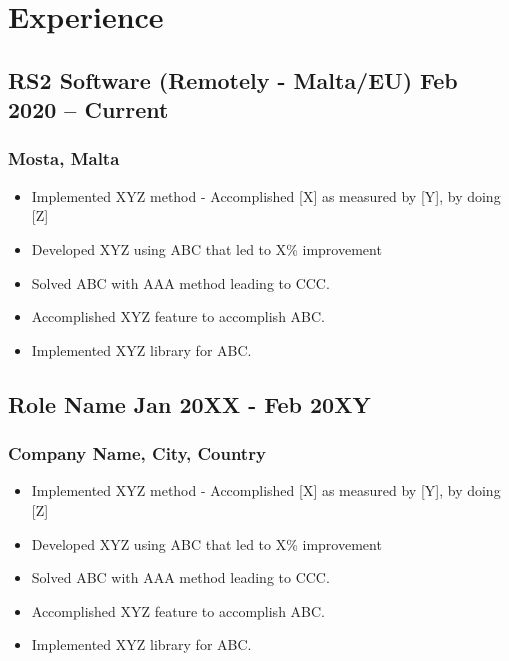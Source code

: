 \documentclass[11pt]{article}
\begin{document}
\section{Experience}
\subsection{RS2 Software (Remotely - Malta/EU) \hfill \normalfont Feb 2020 -- Current}
\subsubsection{Mosta, Malta}
\begin{itemize}
    \item[\checkmark] Implemented XYZ method - Accomplished [X] as measured by [Y], by doing [Z] 
    \item[\checkmark]  Developed XYZ using ABC that led to X\% improvement 
    \item[\checkmark] Solved ABC with AAA method leading to CCC.
    \item[\checkmark]  Accomplished XYZ feature to accomplish ABC.
    \item[\checkmark]  Implemented XYZ library for ABC.
\end{itemize}

\subsection{Role Name \hfill \normalfont Jan 20XX - Feb 20XY}
\subsubsection{Company Name, City, Country}
\begin{itemize}
    \item[\checkmark] Implemented XYZ method - Accomplished [X] as measured by [Y], by doing [Z] 
    \item[\checkmark]  Developed XYZ using ABC that led to X\% improvement 
    \item[\checkmark] Solved ABC with AAA method leading to CCC.
    \item[\checkmark]  Accomplished XYZ feature to accomplish ABC.
    \item[\checkmark]  Implemented XYZ library for ABC.
\end{itemize}
\end{document}
